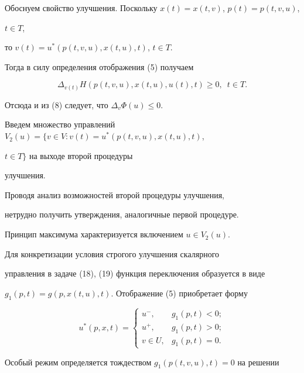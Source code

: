\medskip





Обоснуем свойство улучшения. Поскольку $x(t)=x(t,v)$, $p(t)=p(t,v,u)$, 


$t\in T$,


то $v(t)=u^*(p(t,v,u),x(t,u),t)$, $t\in T$.


Тогда в силу определения отображения (5) получаем 


$$


\Delta_{v(t)}H(p(t,v,u),x(t,u),u(t),t)\ge0,\ \; t\in T.


$$


Отсюда и из (8) следует, что $\Delta_v\Phi(u)\le0$.





Введем множество управлений $V_2(u)=\{v\in V:v(t)=u^*(p(t,v,u),x(t,u),t)$, 


$t\in T\}$ на выходе второй процедуры 


улучшения.





Проводя анализ возможностей второй процедуры улучшения, 


нетрудно получить утверждения, аналогичные первой процедуре.





Принцип максимума характеризуется включением $u\in V_2(u)$.





Для конкретизации условия строгого улучшения скалярного 


управления в задаче (18), (19) функция переключения образуется в виде 


$g_1(p,t)=g(p,x(t,u),t)$. Отображение (5) приобретает форму


$$


u^*(p,x,t)=


\begin{cases}


u^-, & g_1(p,t)<0;\\


u^+, & g_1(p,t)>0;\\


v\in U, & g_1(p,t)=0.


\end{cases}


$$


Особый режим определяется тождеством $g_1(p(t,v,u),t)=0$ на решении 


